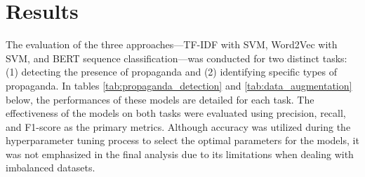 \documentclass[twocolumn]{article}
\begin{document}
\section{Results}

The evaluation of the three approaches—TF-IDF with SVM, Word2Vec with SVM, and BERT sequence classification—was conducted for two distinct tasks: (1) detecting the presence of propaganda and (2) identifying specific types of propaganda. In tables \ref{tab:propaganda_detection} and \ref{tab:data_augmentation} below, the performances of these models are detailed for each task. The effectiveness of the models on both tasks were evaluated using precision, recall, and F1-score as the primary metrics. Although accuracy was utilized during the hyperparameter tuning process to select the optimal parameters for the models, it was not emphasized in the final analysis due to its limitations when dealing with imbalanced datasets.
\end{document}
